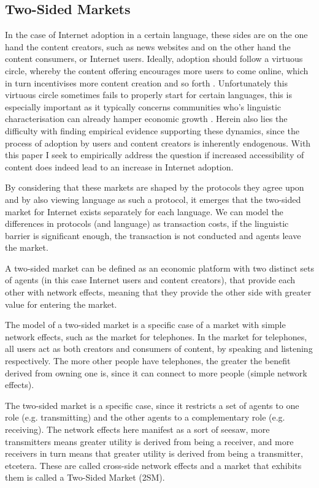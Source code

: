 \documentclass[a4paper,british]{article}\usepackage[]{graphicx}\usepackage[]{color}
\begin{document}
\subsection{Two-Sided Markets}

In the case of Internet adoption in a certain language, these sides
are on the one hand the content creators, such as news websites and
on the other hand the content consumers, or Internet users. Ideally,
adoption should follow a virtuous circle, whereby the content offering
encourages more users to come online, which in turn incentivises more
content creation and so forth \citep{rochet2003platform,rochet2006two}.
Unfortunately this virtuous circle sometimes fails to properly start
for certain languages, this is especially important as it typically
concerns communities who's linguistic characterisation can already
hamper economic growth \citep{arcand2013language}. Herein also lies
the difficulty with finding empirical evidence supporting these dynamics,
since the process of adoption by users and content creators is inherently
endogenous. With this paper I seek to empirically address the question
if increased accessibility of content does indeed lead to an increase
in Internet adoption.

By considering that these markets are shaped by the protocols they
agree upon and by also viewing language as such a protocol, it emerges
that the two-sided market for Internet exists separately for each
language. We can model the differences in protocols (and language)
as transaction costs, if the linguistic barrier is significant enough,
the transaction is not conducted and agents leave the market.

A two-sided market can be defined as an economic platform with two
distinct sets of agents (in this case Internet users and content creators),
that provide each other with network effects, meaning that they provide
the other side with greater value for entering the market. 

The model of a two-sided market is a specific case of a market with
simple network effects, such as the market for telephones. In the
market for telephones, all users act as both creators and consumers
of content, by speaking and listening respectively. The more other
people have telephones, the greater the benefit derived from owning
one is, since it can connect to more people (simple network effects).

The two-sided market is a specific case, since it restricts a set
of agents to one role (e.g. transmitting) and the other agents to
a complementary role (e.g. receiving). The network effects here manifest
as a sort of seesaw, more transmitters means greater utility is derived
from being a receiver, and more receivers in turn means that greater
utility is derived from being a transmitter, etcetera. These are called
cross-side network effects and a market that exhibits them is called
a Two-Sided Market (2SM). 
\end{document}
